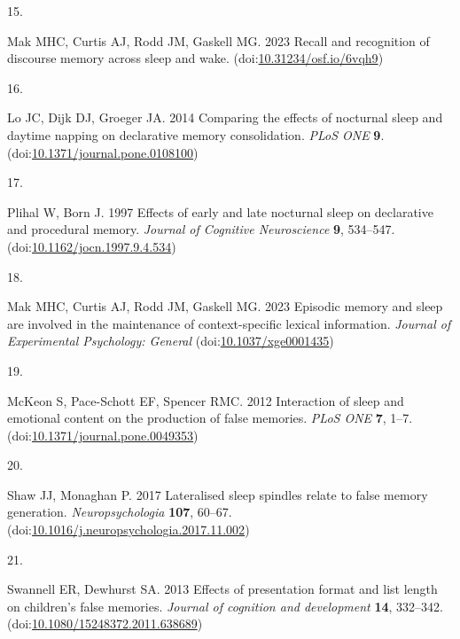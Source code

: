 \documentclass[
]{article}
\newlength{\cslhangindent}
\newlength{\csllabelwidth}
\newlength{\cslentryspacingunit} %
\newenvironment{CSLReferences}[2] %
 {%
  \setlength{\parindent}{0pt}
  \ifodd #1
  \let\oldpar\par
  \def\par{\hangindent=\cslhangindent\oldpar}
  \fi
  \setlength{\parskip}{#2\cslentryspacingunit}
 }%
 {}
\newcommand{\CSLLeftMargin}[1]{\parbox[t]{\csllabelwidth}{#1}}
\newcommand{\CSLRightInline}[1]{\parbox[t]{\linewidth - \csllabelwidth}{#1}\break}
\begin{document}
\begin{CSLReferences}{0}{0}
\leavevmode{}%
\CSLLeftMargin{15. }%
\CSLRightInline{Mak MHC, Curtis AJ, Rodd JM, Gaskell MG. 2023 Recall and recognition of discourse memory across sleep and wake. (doi:\href{https://doi.org/10.31234/osf.io/6vqh9}{10.31234/osf.io/6vqh9})}

\leavevmode{}%
\CSLLeftMargin{16. }%
\CSLRightInline{Lo JC, Dijk DJ, Groeger JA. 2014 Comparing the effects of nocturnal sleep and daytime napping on declarative memory consolidation. \emph{PLoS ONE} \textbf{9}. (doi:\href{https://doi.org/10.1371/journal.pone.0108100}{10.1371/journal.pone.0108100})}

\leavevmode{}%
\CSLLeftMargin{17. }%
\CSLRightInline{Plihal W, Born J. 1997 Effects of early and late nocturnal sleep on declarative and procedural memory. \emph{Journal of Cognitive Neuroscience} \textbf{9}, 534--547. (doi:\href{https://doi.org/10.1162/jocn.1997.9.4.534}{10.1162/jocn.1997.9.4.534})}

\leavevmode{}%
\CSLLeftMargin{18. }%
\CSLRightInline{Mak MHC, Curtis AJ, Rodd JM, Gaskell MG. 2023 Episodic memory and sleep are involved in the maintenance of context-specific lexical information. \emph{Journal of Experimental Psychology: General} (doi:\href{https://doi.org/10.1037/xge0001435}{10.1037/xge0001435})}

\leavevmode{}%
\CSLLeftMargin{19. }%
\CSLRightInline{McKeon S, Pace-Schott EF, Spencer RMC. 2012 Interaction of sleep and emotional content on the production of false memories. \emph{PLoS ONE} \textbf{7}, 1--7. (doi:\href{https://doi.org/10.1371/journal.pone.0049353}{10.1371/journal.pone.0049353})}

\leavevmode{}%
\CSLLeftMargin{20. }%
\CSLRightInline{Shaw JJ, Monaghan P. 2017 Lateralised sleep spindles relate to false memory generation. \emph{Neuropsychologia} \textbf{107}, 60--67. (doi:\href{https://doi.org/10.1016/j.neuropsychologia.2017.11.002}{10.1016/j.neuropsychologia.2017.11.002})}

\leavevmode{}%
\CSLLeftMargin{21. }%
\CSLRightInline{Swannell ER, Dewhurst SA. 2013 Effects of presentation format and list length on children's false memories. \emph{Journal of cognition and development} \textbf{14}, 332--342. (doi:\href{https://doi.org/10.1080/15248372.2011.638689}{10.1080/15248372.2011.638689})}


\end{CSLReferences}
\end{document}
